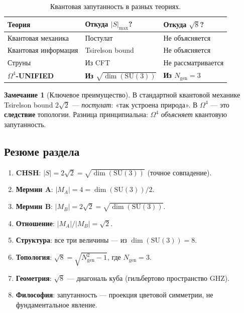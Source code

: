 \documentclass[11pt,a4paper]{article}
\newcommand{\SU}{\mathrm{SU}}
\newcommand{\Om}{\Omega^4}
\theoremstyle{definition}
\newtheorem{remark}[theorem]{Замечание}
\begin{document}
\begin{table}[htbp]
\centering
\caption{Квантовая запутанность в разных теориях.}
\label{tab:entanglement-comparison}
\begin{tabular}{p{3.5cm}p{5cm}p{5cm}}
\toprule
Теория & Откуда $|S|_{\max}$? & Откуда $\sqrt{8}$? \\
\midrule
Квантовая механика & Постулат & Не объясняется \\[0.3em]
Квантовая информация & Tsirelson bound & Не объясняется \\[0.3em]
Струны & Из CFT & Не рассматривается \\[0.3em]
\textbf{$\Om$-UNIFIED} & 
    \textbf{Из $\sqrt{\dim(\SU(3))}$} & 
    \textbf{Из $N_{\text{gen}} = 3$} \\
\bottomrule
\end{tabular}
\end{table}

\begin{remark}[Ключевое преимущество]
\label{rem:entanglement-advantage}
В стандартной квантовой механике Tsirelson bound 
$2\sqrt{2}$ — \emph{постулат}: «так устроена природа». 
В $\Om$ — это \textbf{следствие} топологии. Разница 
принципиальна: $\Om$ \emph{объясняет} квантовую запутанность.
\end{remark}

\subsection{Резюме раздела}
\label{subsec:entanglement-summary}

\begin{enumerate}
    \item \textbf{CHSH}: $|S| = 2\sqrt{2} = \sqrt{\dim(\SU(3))}$ 
          (точное совпадение).
    \item \textbf{Мермин A}: $|M_A| = 4 = \dim(\SU(3))/2$.
    \item \textbf{Мермин B}: $|M_B| = 2\sqrt{2} = \sqrt{\dim(\SU(3))}$.
    \item \textbf{Отношение}: $|M_A| / |M_B| = \sqrt{2}$.
    \item \textbf{Структура}: все три величины — из 
          $\dim(\SU(3)) = 8$.
    \item \textbf{Топология}: $\sqrt{8} = \sqrt{N_{\text{gen}}^2 - 1}$, 
          где $N_{\text{gen}} = 3$.
    \item \textbf{Геометрия}: $\sqrt{8}$ — диагональ куба 
          (гильбертово пространство GHZ).
    \item \textbf{Философия}: запутанность — проекция цветовой 
          симметрии, не фундаментальное явление.
\end{enumerate}
\end{document}
